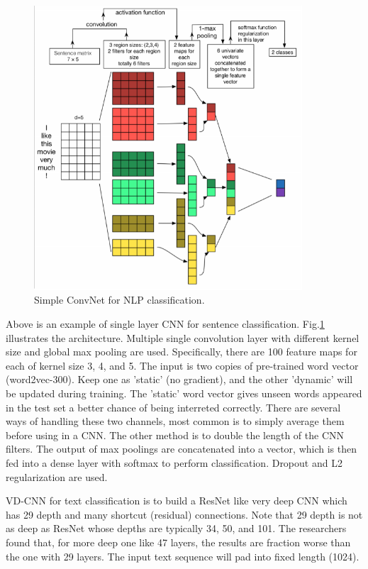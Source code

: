 \begin{figure}[!thp]
	\centerline{\includegraphics[width=10.0cm]{figs/ConvNet_NLP.png}}
	\caption{Simple ConvNet for NLP classification.}
	\label{fig:ConvNetNLP}
\end{figure}

Above is an example  of single layer CNN for sentence classification.
Fig.\ref{fig:ConvNetNLP} illustrates the architecture.
Multiple single convolution layer with different kernel size and global max pooling are used.
Specifically, there are 100 feature maps for each of kernel size 3, 4, and 5. 
The input is two copies of pre-trained word vector (word2vec-300).
Keep one as 'static' (no gradient), and the other 'dynamic' will be updated during training.
The 'static' word vector gives unseen words appeared in the test set a better chance of being interreted correctly.
There are several ways of handling these two channels, most common is to simply average them before using in a CNN.
The other method is to double the length of the CNN filters.
The output of max poolings are concatenated into a vector, which is then fed into a dense layer with softmax to perform classification.
Dropout and L2 regularization are used.

VD-CNN  for text classification is to build a ResNet like very deep CNN which has 29 depth and many shortcut (residual) connections.
Note that 29 depth is not as deep as ResNet whose depths are typically 34, 50, and 101.
The researchers found that, for more deep one like 47 layers, the results are fraction worse than the one with 29 layers.
The input text sequence will pad into fixed length (1024).

